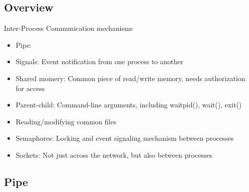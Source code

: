 \documentclass[12pt]{article}
\begin{document}
\subsection{Overview}
Inter-Process Communication mechanisms
\begin{itemize}
    \item Pipe: 
    \item Signals: Event notification from one process to another
    \item Shared momery: Common piece of read/write memory, needs authorization for access
    \item Parent-child: Command-line arguments, including waitpid(), wait(), exit()
    \item Reading/modifying common files
    \item Semaphores: Locking and event signaling mechanism between processes
    \item Sockets: Not just across the network, but also between processes
\end{itemize}

\subsection{Pipe}
\end{document}
